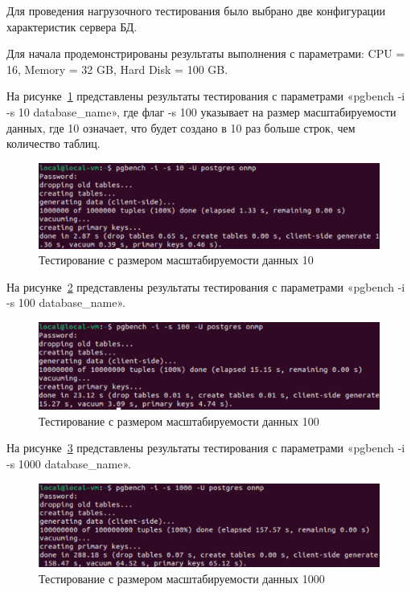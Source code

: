 
Для проведения нагрузочного тестирования было выбрано две конфигурации характеристик сервера БД.

Для начала продемонстрированы результаты выполнения с параметрами: CPU = 16, Memory = 32 GB, Hard Disk = 100 GB.

На рисунке~\ref{fig:b1} представлены результаты тестирования с параметрами «pgbench -i -s 10 database\_name», где флаг -s 100 указывает на размер масштабируемости данных, где 10 означает, что будет создано в 10 раз больше строк, чем количество таблиц.

\begin{figure}
    \includegraphics[width=16.5cm]{inc/test1_1}
    \caption{Тестирование с размером масштабируемости данных 10}
    \label{fig:b1}
\end{figure}

На рисунке~\ref{fig:b2} представлены результаты тестирования с параметрами «pgbench -i -s 100 database\_name».

\begin{figure}
    \includegraphics[width=16.5cm]{inc/test1_2}
    \caption{Тестирование с размером масштабируемости данных 100}
    \label{fig:b2}
\end{figure}

На рисунке~\ref{fig:b3} представлены результаты тестирования с параметрами «pgbench -i -s 1000 database\_name».

\begin{figure}
    \includegraphics[width=16.5cm]{inc/test1_3}
    \caption{Тестирование с размером масштабируемости данных 1000}
    \label{fig:b3}
\end{figure}

